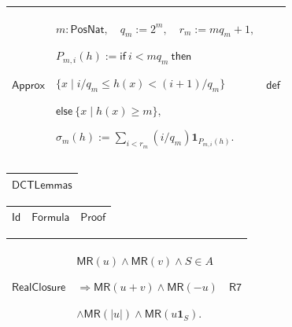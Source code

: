 \documentclass[11pt]{amsart}
\renewcommand{\arraystretch}{1.4}
\newlength{\FTCOneColumnBody}
\newlength{\FTCThreeColumnBody}
\begin{document}
{\begin{tabular}{|@{}>{\centering\arraybackslash}m{0.251968\FTCThreeColumnBody}|>{\centering\arraybackslash}m{0.590551\FTCThreeColumnBody}|>{\centering\arraybackslash}m{0.157480\FTCThreeColumnBody}|}
\hypertarget{dctdef:Approx}{$\displaystyle \textsf{Approx}$} & $\displaystyle m:\textsf{PosNat},\quad q_m:=2^m,\quad r_m:=mq_m+1,$\par
$\displaystyle P_{m,i}(h):=\textsf{if}\ i<mq_m\ \textsf{then}$\par
$\displaystyle \{x\mid i/q_m\le h(x)<(i+1)/q_m\}$\par
$\displaystyle \textsf{else}\ \{x\mid h(x)\ge m\},$\par
$\displaystyle \sigma_m(h):=\sum_{i<r_m}(i/q_m)\mathbf1_{P_{m,i}(h)}.$ & $\displaystyle \textsf{def}$\\ \hline
\end{tabular}%
\par
}

{\centering
\renewcommand{\arraystretch}{1.4}
\par\setlength{\parskip}{0pt}\nointerlineskip
\noindent
\begin{tabular}{|@{}>{\centering\arraybackslash}m{\FTCOneColumnBody}|}\hline
$\displaystyle \textsf{DCTLemmas}$\\ \hline
\end{tabular}%
\par\setlength{\parskip}{0pt}\nointerlineskip
\noindent
\begin{tabular}{|@{}>{\centering\arraybackslash}m{0.251968\FTCThreeColumnBody}|>{\centering\arraybackslash}m{0.590551\FTCThreeColumnBody}|>{\centering\arraybackslash}m{0.157480\FTCThreeColumnBody}|}\hline
$\displaystyle \textsf{Id}$ & $\displaystyle \textsf{Formula}$ & $\displaystyle \textsf{Proof}$\\ \hline
\end{tabular}%
\par\setlength{\parskip}{0pt}\nointerlineskip
\noindent
\begin{tabular}{|@{}>{\centering\arraybackslash}m{0.251968\FTCThreeColumnBody}|>{\centering\arraybackslash}m{0.590551\FTCThreeColumnBody}|>{\centering\arraybackslash}m{0.157480\FTCThreeColumnBody}|}\hline
\hypertarget{dctlem:RealClosure}{$\displaystyle \textsf{RealClosure}$} & $\displaystyle \textsf{MR}(u)\land\textsf{MR}(v)\land S\in A$\par
$\displaystyle \Rightarrow\textsf{MR}(u+v)\land\textsf{MR}(-u)$\par
$\displaystyle \land\textsf{MR}(|u|)\land\textsf{MR}(u\mathbf1_S).$ & \hyperlink{dct:R7}{$\displaystyle \textsf{R7}$}\\ \hline
\end{tabular}%
\par\setlength{\parskip}{0pt}\nointerlineskip
}
\end{document}
